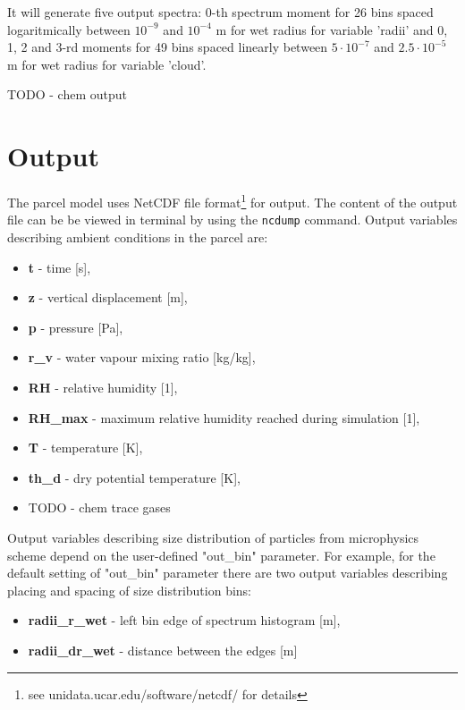 \documentclass[11pt]{article}
\newcommand{\prog}[1]{{\tt#1}}
\begin{document}
\begin{itemize}
\vspace{0.35cm}
   It will generate five output spectra:
      0-th spectrum moment for 26 bins spaced logaritmically between $10^{-9}$ and $10^{-4}$ m for wet radius for variable 'radii' and 
      0, 1, 2 and 3-rd moments for 49 bins spaced linearly between $5\cdot10^{-7}$ and $2.5\cdot10^{-5}$ m for wet radius for variable 'cloud'.

    TODO - chem output

\end{itemize}

\section{Output}

The parcel model uses NetCDF file format\footnote{see unidata.ucar.edu/software/netcdf/ for details} for output.
The content of the output file can be be viewed in terminal by using the \prog{ncdump} command.
Output variables describing ambient conditions in the parcel are:

\begin{itemize}
  \item \textbf{t} - time [s],
  \item \textbf{z} - vertical displacement [m],
  \item \textbf{p} - pressure [Pa],
  \item \textbf{r\_v} - water vapour mixing ratio [kg/kg],
  \item \textbf{RH} - relative humidity [1],
  \item \textbf{RH\_{max}} - maximum relative humidity reached during simulation [1],
  \item \textbf{T} - temperature [K],
  \item \textbf{th\_d} - dry potential temperature [K],
  \item TODO - chem trace gases
\end{itemize}

\noindent
Output variables describing size distribution of particles from microphysics scheme depend 
  on the user-defined "out\_bin" parameter.
For example, for the default setting of "out\_bin" parameter there are two output variables 
  describing placing and spacing of size distribution bins:

\begin{itemize}
  \item \textbf{radii\_r\_wet} - left bin edge of spectrum histogram [m],
  \item \textbf{radii\_dr\_wet} - distance between the edges [m]
\end{itemize}
\end{document}
